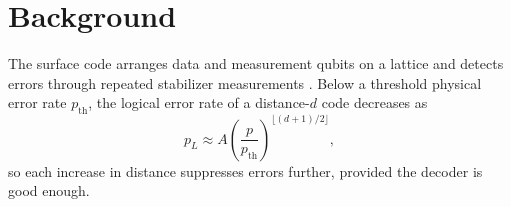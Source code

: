 \chapter{Background}
\label{ch:background}

The surface code arranges data and measurement qubits on a lattice and detects errors through
repeated stabilizer measurements \citep{kitaev2003, fowler2012}. Below a threshold physical error
rate $p_{\mathrm{th}}$, the logical error rate of a distance-$d$ code decreases as
\begin{equation}
  p_L \approx A \left(\frac{p}{p_{\mathrm{th}}}\right)^{\lfloor (d+1)/2 \rfloor},
  \label{eq:threshold}
\end{equation}
so each increase in distance suppresses errors further, provided the decoder is good enough.

